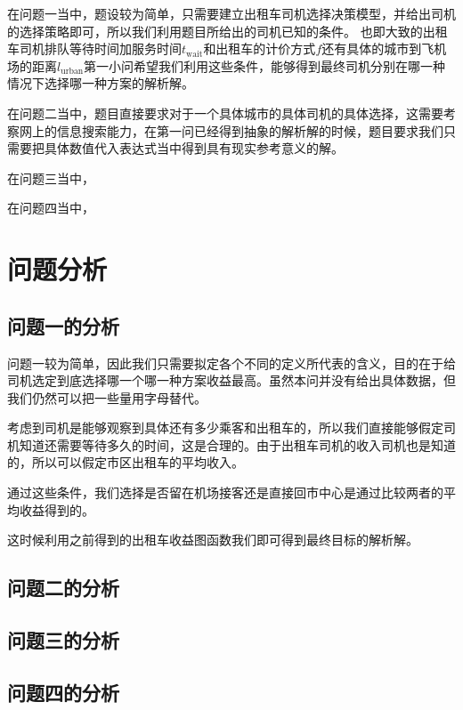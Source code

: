 \documentclass{cumcmthesis}
\begin{document}
\par
在问题一当中，题设较为简单，只需要建立出租车司机选择决策模型，并给出司机的选择策略即可，所以我们利用题目所给出的司机已知的条件。
也即大致的出租车司机排队等待时间加服务时间$t_{ \mathrm{wait}}$和出租车的计价方式$f$还有具体的城市到飞机场的距离$l_{\mathrm{urban}}$第一小问希望我们利用这些条件，能够得到最终司机分别在哪一种情况下选择哪一种方案的解析解。

\par
在问题二当中，题目直接要求对于一个具体城市的具体司机的具体选择，这需要考察网上的信息搜索能力，在第一问已经得到抽象的解析解的时候，题目要求我们只需要把具体数值代入表达式当中得到具有现实参考意义的解。

\par
在问题三当中，

\par
在问题四当中，

\newpage
\section{问题分析}
\subsection{问题一的分析}
问题一较为简单，因此我们只需要拟定各个不同的定义所代表的含义，目的在于给司机选定到底选择哪一个哪一种方案收益最高。虽然本问并没有给出具体数据，但我们仍然可以把一些量用字母替代。\par
考虑到司机是能够观察到具体还有多少乘客和出租车的，所以我们直接能够假定司机知道还需要等待多久的时间，这是合理的。由于出租车司机的收入司机也是知道的，所以可以假定市区出租车的平均收入。\par
通过这些条件，我们选择是否留在机场接客还是直接回市中心是通过比较两者的平均收益得到的。\par
这时候利用之前得到的出租车收益图函数我们即可得到最终目标的解析解。\par

\subsection{问题二的分析}


\subsection{问题三的分析}


\subsection{问题四的分析}
\end{document}

